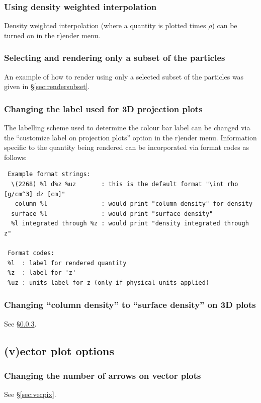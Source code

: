\documentclass[a4paper,10pt]{article}
\begin{document}
\subsubsection{ Using density weighted interpolation}
 Density weighted interpolation (where a quantity is plotted times $\rho$) can be turned on in the r)ender menu.

\subsubsection{ Selecting and rendering only a subset of the particles}
 An example of how to render using only a selected subset of the particles was given in \S\ref{sec:rendersubset}.

\subsubsection{ Changing the label used for 3D projection plots}
\label{sec:setprojlabel}
The labelling scheme used to determine the colour bar label can be changed via the ``customize label on projection plots'' option in the r)ender menu. Information specific to the quantity being rendered can be incorporated via format codes as follows:
\begin{verbatim}
 Example format strings: 
  \(2268) %l d%z %uz       : this is the default format "\int rho [g/cm^3] dz [cm]"
   column %l               : would print "column density" for density
  surface %l               : would print "surface density"
  %l integrated through %z : would print "density integrated through z"

 Format codes: 
 %l  : label for rendered quantity 
 %z  : label for 'z' 
 %uz : units label for z (only if physical units applied)
\end{verbatim}


\subsubsection{ Changing ``column density'' to ``surface density'' on 3D plots}
See \S\ref{sec:setprojlabel}.

\subsection{(v)ector plot options}%
\label{sec:vectorplots}

\subsubsection{ Changing the number of arrows on vector plots}
 See \S\ref{sec:vecpix}.
\end{document}
